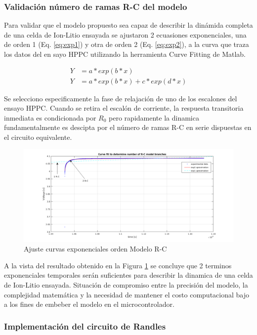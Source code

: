\documentclass[10pt, a4paper]{article}
\begin{document}
\subsubsection{Validación número de ramas R-C del modelo}

Para validar que el modelo propuesto sea capaz de describir la dinámida completa
de una celda de Ion-Litio ensayada se ajustaron 2 ecuasiones exponenciales, una
de orden 1 (Eq. \ref{eq:exp1}) y otra de orden 2 (Eq. \ref{eq:exp2}), a la curva
que traza los datos del en sayo HPPC utilizando la herramienta Curve Fitting de
Matlab.

\begin{align}
    Y &= a*exp(b*x)\label{eq:exp1}\\
    Y &= a*exp(b*x)+c*exp(d*x)\label{eq:exp2}
\end{align}

Se selecciono especificamente la fase de relajación de uno de los escalones del
ensayo HPPC. Cuando se retira el escalón de corriente, la respuesta transitoria
inmediata es condicionada por $R_{0}$ pero rapidamente la dinamica
fundamentalmente es descipta por el número de ramas R-C en serie dispuestas en
el circuito equivalente. 

\begin{figure}[h!]
    \begin{center}
        \includegraphics[width=.65\textwidth]{rc_model_fit.png}
        \caption{Ajuste curvas exponenciales orden Modelo R-C}
        \label{fig:model_fit}
    \end{center}
\end{figure}
\FloatBarrier

A la vista del resultado obtenido en la Figura \ref{fig:model_fit} se concluye
que 2 terminos exponenciales temporales serán suficientes para describir la
dinamica de una celda de Ion-Litio ensayada. Situación de compromiso entre
la precisión del modelo, la complejidad matemática y la necesidad de mantener el
costo computacional bajo a los fines de embeber el modelo en el
microcontrolador. 

\subsubsection{Implementación del circuito de Randles}
\end{document}
